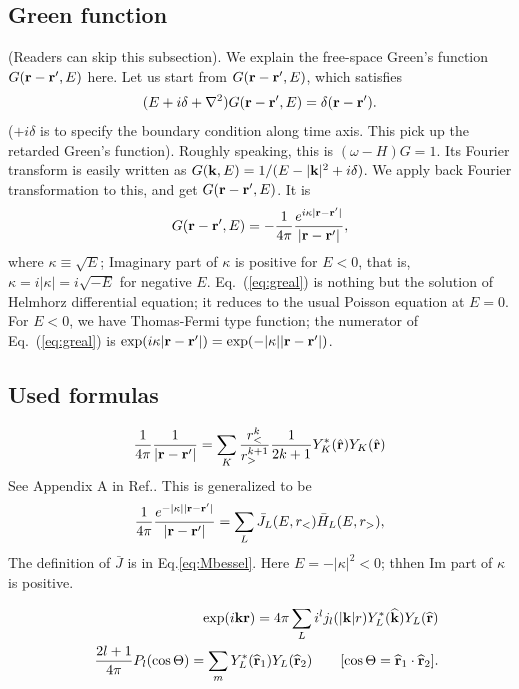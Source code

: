 \documentclass[a4paper,10pt,epsf,fleqn]{article}
\newcommand{\bfk}{{\bf k}}
\newcommand{\bfr}{{\bf r}}
\newcommand{\req}[1]{\mbox{Eq.~(\ref{#1})}}
\begin{document}
\subsection{Green function}
(Readers can skip this subsection).
We explain the free-space Green's function
$G(\bfr-\bfr',E)$ here.
Let us start from $G(\bfr-\bfr',E)$, which satisfies
\begin{eqnarray}
(E+i\delta+\nabla^2)G(\bfr-\bfr',E)=\delta(\bfr-\bfr').
\label{eq:diffg}
\end{eqnarray}
($+i\delta$ is to specify the boundary condition along time axis. This pick up the retarded Green's function).
Roughly speaking, this is $(\omega -H) G=1$.
Its Fourier transform is easily written as
$G(\bfk,E)=1/(E-|\bfk|^2+ i \delta)$.
We apply back Fourier transformation to this, and get $G(\bfr-\bfr',E)$.
It is
\begin{eqnarray}
G(\bfr-\bfr',E)=-\frac{1}{4 \pi} 
\frac{e^{i \kappa|\bfr-\bfr'|}}{|\bfr-\bfr'|}, \label{eq:greal}
\end{eqnarray}
where $\kappa \equiv \sqrt{E}$; Imaginary part of $\kappa$ is positive
for $E<0$, that is, $\kappa = i |\kappa|= i \sqrt{-E}$ for negative $E$.
\req{eq:greal} is nothing but the solution of Helmhorz 
differential equation; it reduces to the usual Poisson equation at
$E=0$. For $E<0$, we have Thomas-Fermi type function;
the numerator of \req{eq:greal} is $\exp(i \kappa |\bfr-\bfr'|)=\exp(- |\kappa| |\bfr-\bfr'|)$.

\subsection{Used formulas}
\label{usedf}

\begin{eqnarray}
\frac{1}{4\pi}\frac{1}{|\bfr-\bfr'|}=\sum_K \frac{r^k_<}{r^{k+1}_>}\frac{1}{2k+1}
Y^*_K(\hat{\bfr})Y_K(\hat{\bfr}) \label{eq:oneorr}
\end{eqnarray}
See Appendix A in Ref.\cite{svane_evaluation_1986}.
This is generalized to be
\begin{eqnarray}
\frac{1}{4\pi}\frac{e^{-|\kappa| |\bfr-\bfr'|}}{|\bfr-\bfr'|}=\sum_L 
\bar{J}_L(E,r_<) \bar{H}_L(E,r_>), \label{eq:oneorr2}
\end{eqnarray}
The definition of $\bar{J}$ is in Eq.\ref{eq:Mbessel}.
Here $E=-|\kappa|^2 <0$; thhen Im part of $\kappa$ is positive.

\begin{eqnarray}
&&\exp( i {\bf k} {\bf r}) = 4 \pi \sum_L i^l 
j_l(|{\bf k}|r)  Y^*_L( {\bf \widehat{ k} }) Y_L(\widehat{{\bf r}}) 
\label{eq:expandpw}\\
&&\frac{2l+1}{4 \pi} P_l(\cos\Theta) = \sum_m Y^*_L( {\bf \widehat{r}}_1) 
Y_L({\bf \widehat{r}}_2) \ \ \ \ \ \ 
[\cos \Theta = {\bf \widehat{r}}_1 \cdot {\bf \widehat{r}}_2].
\end{eqnarray}
\end{document}
